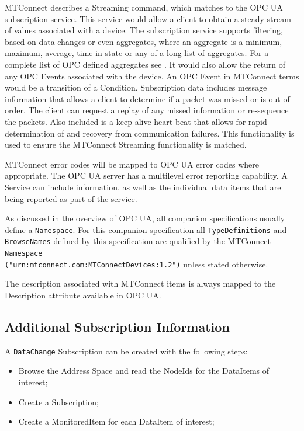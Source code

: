 MTConnect describes a Streaming command, which matches to the OPC UA subscription service. This service would allow a client to obtain a steady stream of values associated with a device. The subscription service supports filtering, based on data changes or even aggregates, where an aggregate is a minimum, maximum, average, time in state or any of a long list of aggregates. For a complete list of OPC defined aggregates see \cite{UAPart11}. It would also allow the return of any OPC Events associated with the device. An OPC Event in MTConnect terms would be a transition of a Condition. Subscription data includes message information that allows a client to determine if a packet was missed or is out of order. The client can request a replay of any missed information or re-sequence the packets. Also included is a keep-alive heart beat that allows for rapid determination of and recovery from communication failures. This functionality is used to ensure the MTConnect Streaming functionality is matched.

MTConnect error codes will be mapped to OPC UA error codes where appropriate. The OPC UA server has a multilevel error reporting capability. A Service can include  	 information, as well as the individual data items that are being reported as part of the service.

As discussed in the overview of OPC UA, all companion specifications usually define a \texttt{Namespace}. For this companion specification all \texttt{Type\-Definitions} and \texttt{Browse\-Names} defined by this specification are qualified by the MTConnect \texttt{Namespace} \\
\texttt{("urn:mtconnect.com:MTConnectDevices:1.2")} unless stated otherwise.

The description associated with MTConnect items is always mapped to the Description attribute available in OPC UA.

\FloatBarrier
\subsection{Additional Subscription Information}

A \texttt{DataChange} Subscription can be created with the following steps:

\begin{itemize}
\item Browse the Address Space and read the NodeIds for the DataItems of interest;
\item Create a Subscription;
\item Create a MonitoredItem for each DataItem of interest;
\end{itemize}

